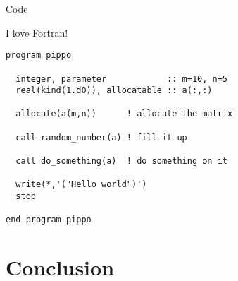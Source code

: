 \documentclass[10pt, compress]{beamer}
\begin{document}








\begin{frame}[fragile]{Code}

  I love Fortran!
  
  \vspace{0.5cm}

\begin{lstlisting}[basicstyle=\tt\scriptsize, showlines=true]
program pippo

  integer, parameter            :: m=10, n=5
  real(kind(1.d0)), allocatable :: a(:,:)

  allocate(a(m,n))      ! allocate the matrix

  call random_number(a) ! fill it up

  call do_something(a)  ! do something on it

  write(*,'("Hello world")')
  stop

end program pippo
\end{lstlisting}

\end{frame}

\section{Conclusion}
\end{document}
